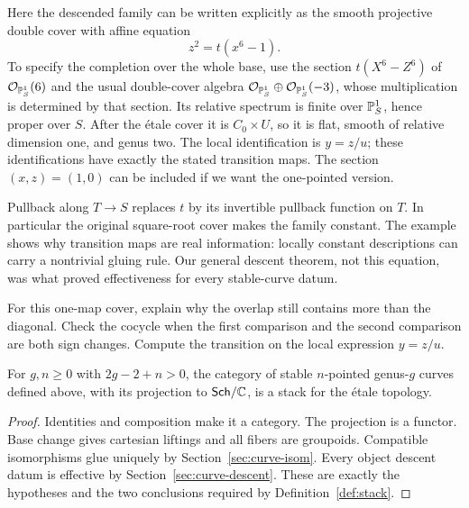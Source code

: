 Here the descended family can be written explicitly as the
smooth projective double cover with affine equation
\[
                            z^2=t(x^6-1).
\]
To specify the completion over the whole base, use the section
$t(X^6-Z^6)$ of $\mathcal O_{\mathbb P^1_S}(6)$ and the usual
double-cover algebra
$\mathcal O_{\mathbb P^1_S}\oplus\mathcal O_{\mathbb P^1_S}(-3)$,
whose multiplication is determined by that section. Its relative
spectrum is finite over $\mathbb P^1_S$, hence proper over $S$.
After the \'etale cover it is $C_0\times U$, so it is flat,
smooth of relative dimension one, and genus two. The local
identification is $y=z/u$; these identifications have exactly
the stated transition maps. The section $(x,z)=(1,0)$ can be
included if we want the one-pointed version.

Pullback along $T\to S$ replaces $t$ by its invertible pullback
function on $T$. In particular the original square-root cover
makes the family constant. The example shows why transition
maps are real information: locally constant descriptions can
carry a nontrivial gluing rule. Our general descent theorem,
not this equation, was what proved effectiveness for every
stable-curve datum.

\begin{Ej}\label{ex:twisted-datum}
For this one-map cover, explain why the overlap still contains
more than the diagonal. Check the cocycle when the first
comparison and the second comparison are both sign changes.
Compute the transition on the local expression $y=z/u$.
\end{Ej}

\begin{Th}\label{th:curve-stack}
For $g,n\geq0$ with $2g-2+n>0$, the category of stable
$n$-pointed genus-$g$ curves defined above, with its projection
to $\mathsf{Sch}/\mathbb C$, is a stack for the \'etale topology.
\end{Th}
\begin{proof}
Identities and composition make it a category. The projection
is a functor. Base change gives cartesian liftings and all
fibers are groupoids. Compatible isomorphisms glue uniquely
by Section~\ref{sec:curve-isom}. Every object descent datum
is effective by Section~\ref{sec:curve-descent}. These are
exactly the hypotheses and the two conclusions required by
Definition~\ref{def:stack}.
\end{proof}


